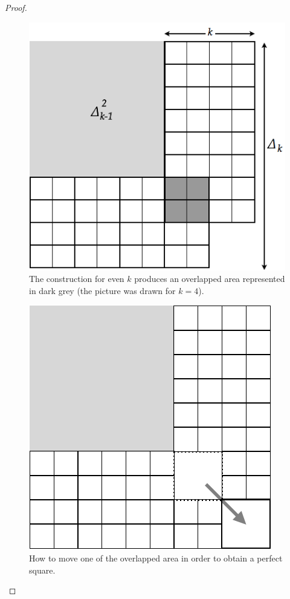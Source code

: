 \begin{proof}
\begin{description}
\begin{figure}[ht]
\begin{center}
       \includegraphics[scale=0.35]{FiguresMaths/SumCubesEven}
\caption{The construction for even $k$ produces  an overlapped area
represented in dark grey (the picture was drawn for $k=4$).}
       \label{fig:sumCubesEven}
\end{center}
\end{figure}
\begin{figure}[ht]
\begin{center}
       \includegraphics[scale=0.4]{FiguresMaths/SumCubesEvenFinal}
\caption{How to move one of the overlapped area in order to obtain a perfect square.}
       \label{fig:sumCubesEvenFinal}
\end{center}
\end{figure}


\end{description}
\end{proof}
